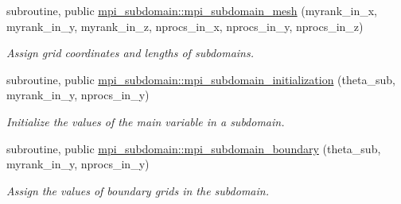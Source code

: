 \begin{DoxyCompactItemize}
subroutine, public \hyperlink{namespacempi__subdomain_a612331eead74041f174ece9a572c7427}{mpi\+\_\+subdomain\+::mpi\+\_\+subdomain\+\_\+mesh} (myrank\+\_\+in\+\_\+x, myrank\+\_\+in\+\_\+y, myrank\+\_\+in\+\_\+z, nprocs\+\_\+in\+\_\+x, nprocs\+\_\+in\+\_\+y, nprocs\+\_\+in\+\_\+z)
\begin{DoxyCompactList}\small\item\em Assign grid coordinates and lengths of subdomains. \end{DoxyCompactList}\item 
subroutine, public \hyperlink{namespacempi__subdomain_a7cc0deb85b84358eb7addeea849733c4}{mpi\+\_\+subdomain\+::mpi\+\_\+subdomain\+\_\+initialization} (theta\+\_\+sub, myrank\+\_\+in\+\_\+y, nprocs\+\_\+in\+\_\+y)
\begin{DoxyCompactList}\small\item\em Initialize the values of the main variable in a subdomain. \end{DoxyCompactList}\item 
subroutine, public \hyperlink{namespacempi__subdomain_a55659431068678c08d21847338390ea8}{mpi\+\_\+subdomain\+::mpi\+\_\+subdomain\+\_\+boundary} (theta\+\_\+sub, myrank\+\_\+in\+\_\+y, nprocs\+\_\+in\+\_\+y)
\begin{DoxyCompactList}\small\item\em Assign the values of boundary grids in the subdomain. \end{DoxyCompactList}\end{DoxyCompactItemize}
